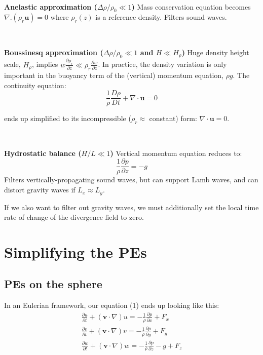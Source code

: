 \documentclass[11pt,fleqn]{book} %
\newcommand{\partd}[2]{\frac{\partial #1}{\partial #2}}
\newcommand{\lagd}[2]{\frac{D #1}{D #2}}
\begin{document}
	~
	
	{\bf Anelastic approximation ($\Delta \rho /\rho_0 \ll 1$)} Mass conservation equation becomes $\nabla.(\rho_r {\mathbf u})=0$
	where $\rho_r(z)$ is a reference density.
	Filters sound waves.
	
	~
	
	{\bf Boussinesq approximation ($\Delta \rho /\rho_0 \ll 1$ and $H\ll H_{\rho}$)} Huge density height scale, $H_{\rho}$, implies $w \partd{\rho_r}{z}\ll
	\rho_r \partd{w}{z}$. In practice, the density variation is only important in the buoyancy term of the (vertical) momentum equation, $\rho g$. The continuity equation:
	\begin{equation}
		\frac{1}{\rho} \lagd{\rho}{t} + \nabla \cdot \mathbf{u} = 0
	\end{equation}
	
	ends up simplified to its incompressible ($\rho_r \approx$ constant) form: $\nabla \cdot \mathbf{u} = 0$. 
	
	~
	
	{\bf Hydrostatic balance ($H/L \ll 1$)} Vertical momentum equation reduces to:
	\begin{equation}
		\frac{1}{\rho}\partd{p}{z}=-g
		\label{hydrostatic}
	\end{equation}
	Filters vertically-propagating sound waves, but can support Lamb waves, and can distort gravity waves if $L_x \approx L_y$.
	
	If we also want to filter out gravity waves, we must additionally set the local time rate of change of the divergence field to zero.
	

\section{Simplifying the PEs}
\subsection{PEs on the sphere}
	In an Eulerian framework, our equation (1) ends up looking like this:
	\begin{eqnarray}
		\frac {\partial u}{\partial t} + \left(\mathbf{v}\cdot\nabla\right)u=-\frac{1}{\rho} \frac{\partial p}{\partial x}+F_x \\
		\frac {\partial v}{\partial t} + \left(\mathbf{v}\cdot\nabla\right)v=-\frac{1}{\rho} \frac{\partial p}{\partial y}+F_y \\
		\frac {\partial w}{\partial t} + \left(\mathbf{v}\cdot\nabla\right)w=-\frac{1}{\rho} \frac{\partial p}{\partial z}-g+F_z
	\end{eqnarray}
	
\end{document}
